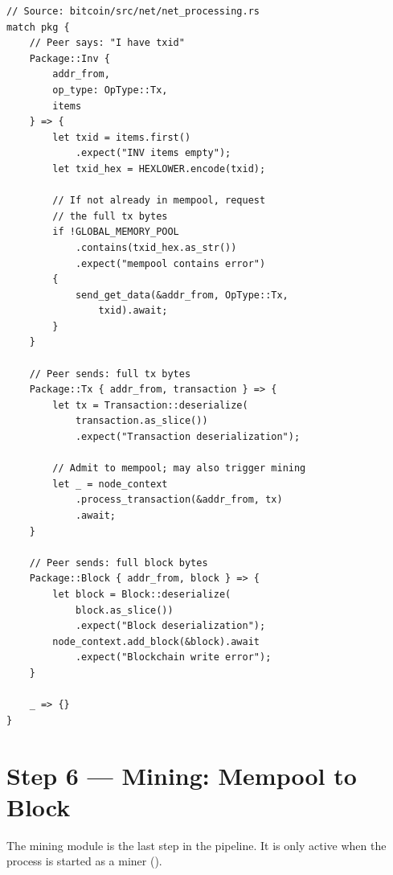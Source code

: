 \begin{listing}[htbp]
\caption{P2P receive: miner gets full tx (, tx-related arms)}
\label{lst:9-9-14}
\begin{verbatim}
// Source: bitcoin/src/net/net_processing.rs
match pkg {
    // Peer says: "I have txid"
    Package::Inv {
        addr_from,
        op_type: OpType::Tx,
        items
    } => {
        let txid = items.first()
            .expect("INV items empty");
        let txid_hex = HEXLOWER.encode(txid);

        // If not already in mempool, request
        // the full tx bytes
        if !GLOBAL_MEMORY_POOL
            .contains(txid_hex.as_str())
            .expect("mempool contains error")
        {
            send_get_data(&addr_from, OpType::Tx,
                txid).await;
        }
    }

    // Peer sends: full tx bytes
    Package::Tx { addr_from, transaction } => {
        let tx = Transaction::deserialize(
            transaction.as_slice())
            .expect("Transaction deserialization");

        // Admit to mempool; may also trigger mining
        let _ = node_context
            .process_transaction(&addr_from, tx)
            .await;
    }

    // Peer sends: full block bytes
    Package::Block { addr_from, block } => {
        let block = Block::deserialize(
            block.as_slice())
            .expect("Block deserialization");
        node_context.add_block(&block).await
            .expect("Blockchain write error");
    }

    _ => {}
}
\end{verbatim}
\end{listing}

\section{Step 6 --- Mining: Mempool to Block}
\label{sec:ch09-9-step6}

The mining module is the last step in the pipeline. It is only active when the process is started as a miner ().

